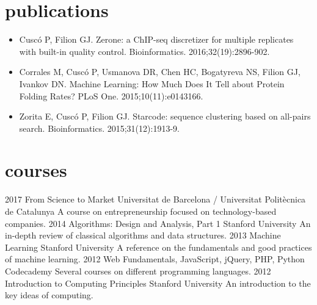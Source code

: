 \documentclass[]{friggeri-cv} %
\begin{document}
\newpage
\section{publications}


\begin{itemize}
    \item Cuscó P, Filion GJ. Zerone: a ChIP-seq discretizer for
        multiple replicates with built-in quality control.
        Bioinformatics. 2016;32(19):2896-902.
    \item Corrales M, Cuscó P, Usmanova DR, Chen HC, Bogatyreva NS,
        Filion GJ, Ivankov DN. Machine Learning: How Much Does It
        Tell about Protein Folding Rates? PLoS One.
        2015;10(11):e0143166.
    \item Zorita E, Cuscó P, Filion GJ. Starcode: sequence clustering
        based on all-pairs search. Bioinformatics. 2015;31(12):1913-9.
\end{itemize}


\section{courses}

\begin{entrylist}
  \entry
    {2017}
    {From Science to Market}
    {Universitat de Barcelona / Universitat Politècnica de Catalunya}
    {A course on entrepreneurship focused on technology-based
    companies.}
  \entry
    {2014}
    {Algorithms: Design and Analysis, Part 1}
    {Stanford University}
    {An in-depth review of classical algorithms and data structures.}
  \entry
    {2013}
    {Machine Learning}
    {Stanford University}
    {A reference on the fundamentals and good practices of
    machine learning.}
  \entry
    {2012}
    {Web Fundamentals, JavaScript, jQuery, PHP, Python}
    {Codecademy}
    {Several courses on different programming languages.}
  \entry
    {2012}
    {Introduction to Computing Principles}
    {Stanford University}
    {An introduction to the key ideas of computing.}
\end{entrylist}

\end{document}
